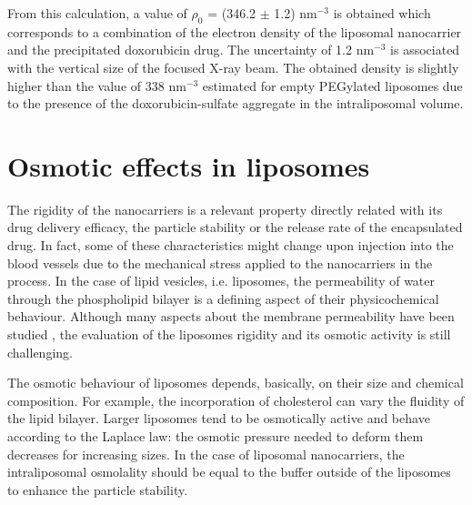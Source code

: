 
From this calculation, a value of $\rho_0$ = (346.2 $\pm$ 1.2) nm$^{-3}$ is obtained which corresponds to a combination of the electron density of the liposomal nanocarrier and the precipitated doxorubicin drug. The uncertainty of 1.2 nm$^{-3}$ is associated with the vertical size of the focused X-ray beam. The obtained density is slightly higher than the value of 338 nm$^{-3}$ estimated for empty PEGylated liposomes \citep{kucerka_structure_2006} due to the presence of the doxorubicin-sulfate aggregate in the intraliposomal volume.

\section{Osmotic effects in liposomes}

The rigidity of the nanocarriers is a relevant property directly related with its drug delivery efficacy, the particle stability or the release rate of the encapsulated drug. In fact, some of these characteristics might change upon injection into the blood vessels due to the mechanical stress applied to the nanocarriers in the process. In the case of lipid vesicles, i.e. liposomes, the permeability of water through the phospholipid bilayer is a defining aspect of their physicochemical behaviour. Although many aspects about the membrane permeability have been studied \citep{nagle_theory_2008, mathai_structural_2008, olbrich_water_2000}, the evaluation of the liposomes rigidity and its osmotic activity is still challenging.

The osmotic behaviour of liposomes depends, basically, on their size and chemical composition. For example, the incorporation of cholesterol can vary the fluidity of the lipid bilayer. Larger liposomes tend to be osmotically active \citep{de_gier_osmotic_1993} and behave according to the Laplace law: the osmotic pressure needed to deform them decreases for increasing sizes. In the case of liposomal nanocarriers, the intraliposomal osmolality should be equal to the buffer outside of the liposomes to enhance the particle stability. 

